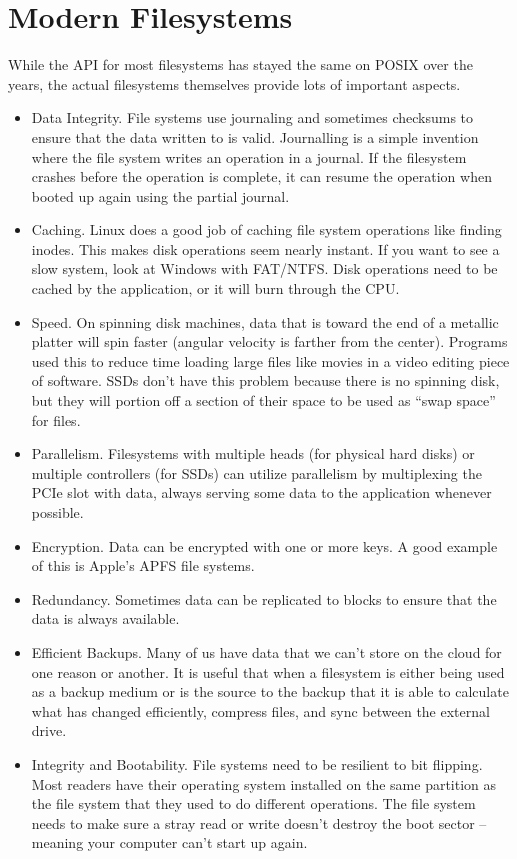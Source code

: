 \section{Modern Filesystems}

While the API for most filesystems has stayed the same on POSIX over the years, the actual filesystems themselves provide lots of important aspects.

\begin{itemize}
\item Data Integrity. File systems use journaling and sometimes checksums to ensure that the data written to is valid. Journalling is a simple invention where the file system writes an operation in a journal. If the filesystem crashes before the operation is complete, it can resume the operation when booted up again using the partial journal.
\item Caching. Linux does a good job of caching file system operations like finding inodes. This makes disk operations seem nearly instant. If you want to see a slow system, look at Windows with FAT/NTFS. Disk operations need to be cached by the application, or it will burn through the CPU.
\item Speed. On spinning disk machines, data that is toward the end of a metallic platter will spin faster (angular velocity is farther from the center). Programs used this to reduce time loading large files like movies in a video editing piece of software. SSDs don't have this problem because there is no spinning disk, but they will portion off a section of their space to be used as ``swap space'' for files.
\item Parallelism. Filesystems with multiple heads (for physical hard disks) or multiple controllers (for SSDs) can utilize parallelism by multiplexing the PCIe slot with data, always serving some data to the application whenever possible.
\item Encryption. Data can be encrypted with one or more keys. A good example of this is Apple's APFS file systems.
\item Redundancy. Sometimes data can be replicated to blocks to ensure that the data is always available.
\item Efficient Backups. Many of us have data that we can't store on the cloud for one reason or another. It is useful that when a filesystem is either being used as a backup medium or is the source to the backup that it is able to calculate what has changed efficiently, compress files, and sync between the external drive.
\item Integrity and Bootability. File systems need to be resilient to bit flipping. Most readers have their operating system installed on the same partition as the file system that they used to do different operations. The file system needs to make sure a stray read or write doesn't destroy the boot sector -- meaning your computer can't start up again.

\end{itemize}
